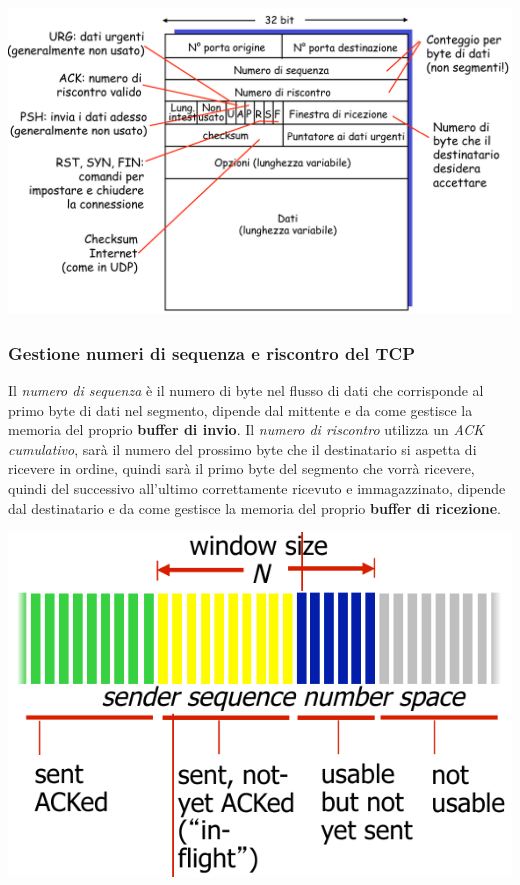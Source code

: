 \begin{center}
  \includegraphics[width=\textwidth]{img/segmento_tcp.png}
\end{center}

\subsubsection{Gestione numeri di sequenza e riscontro del TCP}
Il \textit{numero di sequenza} è il numero di byte nel flusso di dati che corrisponde al primo byte di dati nel segmento, dipende dal mittente e da come gestisce la memoria del proprio \textbf{buffer di invio}.
Il \textit{numero di riscontro} utilizza un \textit{ACK cumulativo}, sarà il numero del prossimo byte che il destinatario si aspetta di ricevere in ordine, quindi sarà il primo byte del segmento che vorrà ricevere, quindi del successivo all'ultimo correttamente ricevuto e immagazzinato, dipende dal destinatario e da come gestisce la memoria del proprio \textbf{buffer di ricezione}.

\begin{center}
\includegraphics[width=\textwidth]{./img/tcpseqack.png}
\end{center}

